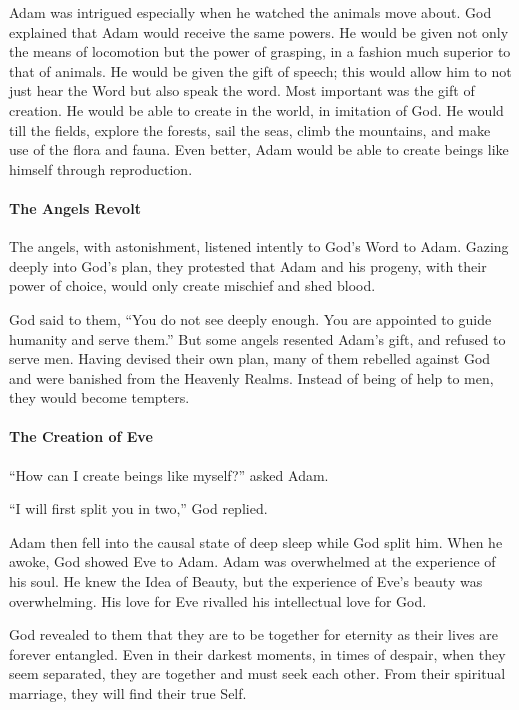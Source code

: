 Adam was intrigued especially when he watched the animals move about. God explained that Adam would receive the same powers. He would be given not only the means of locomotion but the power of grasping, in a fashion much superior to that of animals. He would be given the gift of speech; this would allow him to not just hear the Word but also speak the word. Most important was the gift of creation. He would be able to create in the world, in imitation of God. He would till the fields, explore the forests, sail the seas, climb the mountains, and make use of the flora and fauna. Even better, Adam would be able to create beings like himself through reproduction.

\paragraph{The Angels Revolt}


The angels, with astonishment, listened intently to God's Word to Adam. Gazing deeply into God's plan, they protested that Adam and his progeny, with their power of choice, would only create mischief and shed blood.

God said to them, ``You do not see deeply enough. You are appointed to guide humanity and serve them.'' But some angels resented Adam's gift, and refused to serve men. Having devised their own plan, many of them rebelled against God and were banished from the Heavenly Realms. Instead of being of help to men, they would become tempters.

\paragraph{The Creation of Eve}


``How can I create beings like myself?'' asked Adam.

``I will first split you in two,'' God replied.

Adam then fell into the causal state of deep sleep while God split him. When he awoke, God showed Eve to Adam. Adam was overwhelmed at the experience of his soul. He knew the Idea of Beauty, but the experience of Eve's beauty was overwhelming. His love for Eve rivalled his intellectual love for God.

God revealed to them that they are to be together for eternity as their lives are forever entangled. Even in their darkest moments, in times of despair, when they seem separated, they are together and must seek each other. From their spiritual marriage, they will find their true Self.


